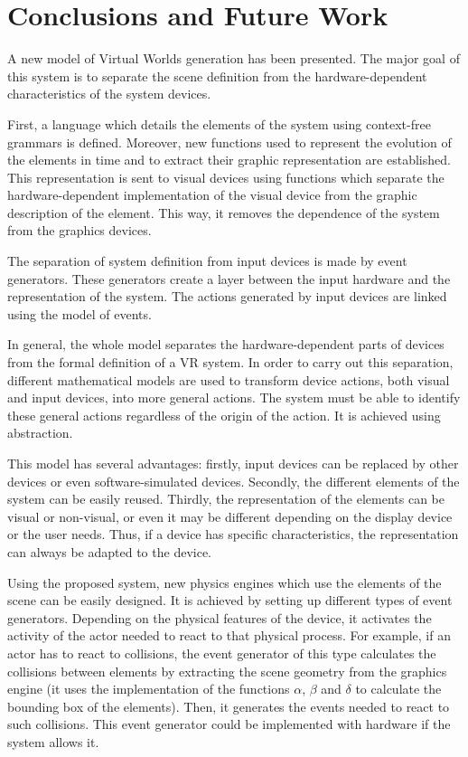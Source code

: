\documentclass[12pt]{article}
\begin{document}
\section{Conclusions and Future Work
\label{sec:conclusions}}

A new model of Virtual Worlds generation has been presented. The major goal of this system is to
separate the scene definition from the hardware-dependent characteristics of the system devices.

First, a language which details the elements of the system using context-free grammars is defined.
Moreover, new functions used to represent the evolution of the elements in time and to extract
their graphic representation are established. This representation is sent to visual devices using
functions which separate the  hardware-dependent implementation of the visual device from the
graphic description of the element. This way, it removes the dependence of the system from the
graphics devices.

The separation of system definition from input devices is made by event generators. These
generators create a layer between the input hardware and the representation of the system. The
actions generated by input devices are linked using the model of events.

In general, the whole model separates the hardware-dependent parts of devices from the formal
definition of a VR system. In order to carry out this separation, different mathematical models are
used to transform device actions, both visual and input devices, into more general actions. The
system must be able to identify these general actions regardless of the origin of the action. It is
achieved using abstraction.

This model has several advantages: firstly, input devices can be replaced by other devices or even
software-simulated devices. Secondly, the different elements of the system can be easily reused.
Thirdly, the representation of the elements can be visual or non-visual, or even it may be
different depending on the display device or the user needs. Thus, if a device has specific
characteristics, the representation can always be adapted to the device.

Using the proposed system, new physics engines which use the elements of the scene can be easily
designed. It is achieved by setting up different types of event generators. Depending on the
physical features of the device, it activates the activity of the actor needed to react to that
physical process. For example, if an actor has to react to collisions, the event generator of this
type calculates the collisions between elements by extracting the scene geometry from the graphics
engine (it uses the implementation of the functions $\alpha$, $\beta$ and $\delta$ to calculate the
bounding box of the elements). Then, it generates the events needed to react to such collisions.
This event generator could be implemented with hardware if the system allows it.
\end{document}
